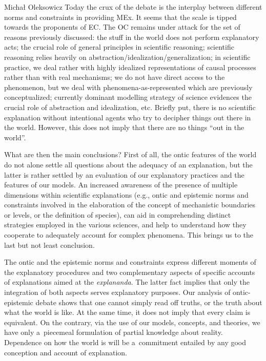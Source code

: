 \begin{artengenv}{Michał Oleksowicz}
Today the crux of the debate is the interplay between different norms and constraints in providing MEx. It seems that the scale is tipped towards the proponents of EC. The OC remains under attack for the set of reasons previously discussed: the stuff in the world does not perform explanatory acts; the crucial role of general principles in scientific reasoning; scientific reasoning relies heavily on abstraction/idealization/generalization; in scientific practice, we deal rather with highly idealized representations of causal processes rather than with real mechanisms; we do not have direct access to the phenomenon, but we deal with phenomena-as-represented which are previously conceptualized; currently dominant modelling strategy of science evidences the crucial role of abstraction and idealization, etc. Briefly put, there is no scientific explanation without intentional agents who try to decipher things out there in the world. However, this does not imply that there are no things ``out in the world''.

What are then the main conclusions? First of all, the ontic features of the world do not alone settle all questions about the adequacy of an explanation, but the latter is rather settled by an evaluation of our explanatory practices and the features of our models. An increased awareness of the presence of multiple dimensions within scientific explanations (e.g., ontic and epistemic norms and constraints involved in the elaboration of the concept of mechanistic boundaries or levels, or the definition of species), can aid in comprehending distinct strategies employed in the various sciences, and help to understand how they cooperate to adequately account for complex phenomena. This brings us to the last but not least conclusion.

The ontic and the epistemic norms and constraints express different moments of the explanatory procedures and two complementary aspects of specific accounts of explanations aimed at the \textit{explananda}. The latter fact implies that only the integration of both aspects serves explanatory purposes. Our analysis of ontic-epistemic debate shows that one cannot simply read off truths, or the truth about what the world is like. At the same time, it does not imply that every claim is equivalent. On the contrary, via the use of our models, concepts, and theories, we have only a~piecemeal formulation of partial knowledge about reality. Dependence on how the world is will be a~commitment entailed by any good conception and account of explanation.

\end{artengenv}
